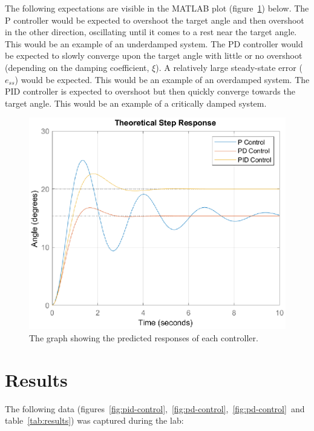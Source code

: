 \documentclass[12pt]{article} %
\begin{document}
\noindent The following expectations are visible in the MATLAB plot (figure\ \ref{fig:prelab}) below. The P controller would be expected to overshoot the target angle and then overshoot in the other direction, oscillating until it comes to a rest near the target angle. This would be an example of an underdamped system.
The PD controller would be expected to slowly converge upon the target angle with little or no overshoot (depending on the damping coefficient, $\xi$). A relatively large steady-state error ($e_{ss}$) would be expected. This would be an example of an overdamped system.
The PID controller is expected to overshoot but then quickly converge towards the target angle. This would be an example of a critically damped system.
\begin{figure}[H]
	\centering
	\includegraphics[scale=0.8]{prelab}
	\caption{The graph showing the predicted responses of each controller.}
	\label{fig:prelab}
\end{figure}

\newpage
\section*{Results}

\noindent The following data (figures\ \ref{fig:pid-control},\ \ref{fig:pd-control},\ \ref{fig:pd-control}\ and table\ \ref{tab:results}) was captured during the lab:
\end{document}

